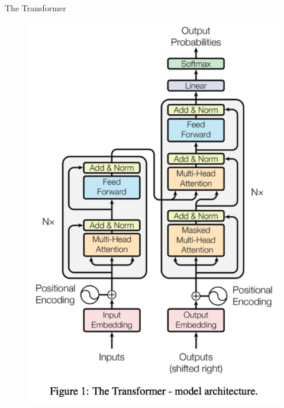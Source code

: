 \documentclass[handout]{beamer}
\begin{document}
\begin{frame}{The Transformer}

     \begin{figure}[h]
        	\includegraphics[scale = 0.29]{pics/transformer.png}
        \end{figure}  


\end{frame}
\end{document}
